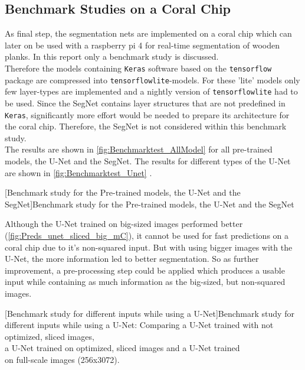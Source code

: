 \subsection{Benchmark Studies on a Coral Chip}
As final step, the segmentation nets are implemented on a coral chip which can later on be used with a raspberry pi 4 for real-time segmentation of wooden planks. In this report only a benchmark study is discussed.\\
Therefore the models containing \verb|Keras| software based on the \verb|tensorflow| package are compressed into \verb|tensorflowlite|-models. For these 'lite' models only few layer-types are implemented and a nightly version of \verb|tensorflowlite| had to be used. Since the SegNet contains layer structures that are not predefined in \verb|Keras|, significantly more effort would be needed to prepare its architecture for the coral chip. Therefore, the SegNet is not considered within this benchmark study. \\
The results are shown in \cref{fig:Benchmarktest_AllModel} for all pre-trained models, the U-Net and the SegNet. The results for different types of the U-Net are shown in \cref{fig:Benchmarktest_Unet} .\\
\begin{minipage}{\textwidth}
    \vspace{5mm}
    \centering
    \hspace{-1.2cm}
	
	[Benchmark study for the Pre-trained models, the U-Net and the SegNet]{Benchmark study for the Pre-trained models, the U-Net and the SegNet}
	\label{fig:Benchmarktest_AllModel}
	\vspace{5mm}
\end{minipage}
Although the U-Net trained on big-sized images performed better (\cref{fig:Preds_unet_sliced_big_mC}), it cannot be used for fast predictions on a coral chip due to it's non-squared input. But with using bigger images with the U-Net, the more information led to better segmentation. So as further improvement, a pre-processing step could be applied which produces a usable input while containing as much information as the big-sized, but non-squared images.\\
\begin{minipage}{\textwidth}
    \centering
    \hspace{-0.687cm}
	
	[Benchmark study for different inputs while using a U-Net]{Benchmark study for different inputs while using a U-Net: Comparing a U-Net trained with not optimized, sliced images,\\ a U-Net trained on optimized, sliced images and a U-Net trained\\ on full-scale images (256x3072).}
	\label{fig:Benchmarktest_Unet}
	\vspace{5mm}
\end{minipage}


